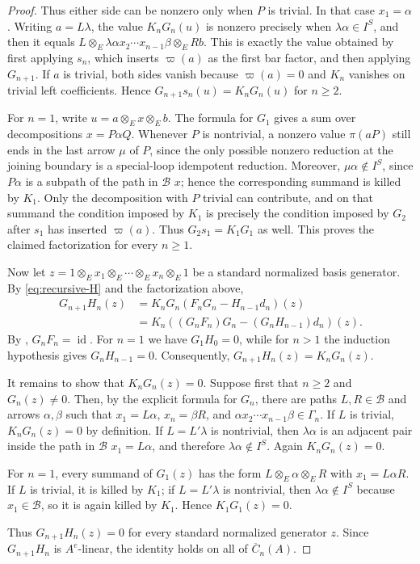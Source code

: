 \documentclass[11pt,a4paper,reqno]{amsart}
\newcommand{\mB}{\mathcal B}
\newcommand{\id}{\operatorname{id}}
\theoremstyle{plain}
\theoremstyle{definition}
\numberwithin{equation}{section}
\begin{document}
\begin{proof}
		Thus either side can be nonzero only when $P$ is trivial.  In that
		case $x_1=\alpha$.  Writing $a=L\lambda$, the value $K_nG_n(u)$ is
		nonzero precisely when $\lambda\alpha\in I^S$, and then it equals
		$L\otimes_E\lambda\alpha x_2\cdots x_{n-1}\beta\otimes_E Rb$.
		This is exactly the value obtained by first applying $s_n$, which
		inserts $\varpi(a)$ as the first bar factor, and then applying
		$G_{n+1}$.  If $a$ is trivial, both sides vanish because $\varpi(a)=0$
		and $K_n$ vanishes on trivial left coefficients.  Hence
		$G_{n+1}s_n(u)=K_nG_n(u)$ for $n\geq2$.
		
		For $n=1$, write $u=a\otimes_E x\otimes_E b$. The formula for $G_1$
		gives a sum over decompositions $x=P\alpha Q$. Whenever $P$ is
		nontrivial, a nonzero value $\pi(aP)$ still ends
		in the last arrow $\mu$ of $P$, since the only possible nonzero reduction
		at the joining boundary is a special-loop idempotent reduction. Moreover,
		$\mu\alpha\notin I^S$, since $P\alpha$ is a subpath of the path in $\mB$
		$x$; hence the corresponding summand is killed by $K_1$.  Only the
		decomposition with $P$ trivial can contribute, and on that summand
		the condition imposed by $K_1$ is precisely the condition imposed by
		$G_2$ after $s_1$ has inserted $\varpi(a)$.  Thus
		$G_2s_1=K_1G_1$ as well.  This proves the claimed factorization for
		every $n\geq1$.
		
		Now let
		$z=1\otimes_E x_1\otimes_E\cdots\otimes_E x_n\otimes_E1$
		be a standard normalized basis generator.  By
		\eqref{eq:recursive-H} and the factorization above,
		\[
		\begin{aligned}
			G_{n+1}H_n(z)
			&=
			K_nG_n(F_nG_n-H_{n-1}d_n)(z)\\
			&=
			K_n((G_nF_n)G_n-(G_nH_{n-1})d_n)(z).
		\end{aligned}
		\]
		By , $G_nF_n=\id$.  For $n=1$ we have
		$G_1H_0=0$, while for $n>1$ the induction hypothesis gives
		$G_nH_{n-1}=0$.  Consequently,
		$G_{n+1}H_n(z)=K_nG_n(z)$.
		
		It remains to show that $K_nG_n(z)=0$.  Suppose first that $n\geq2$
		and $G_n(z)\neq0$.  Then, by the explicit formula for $G_n$, there
		are paths $L,R\in\mB$ and arrows $\alpha,\beta$ such that
		$x_1=L\alpha$, $x_n=\beta R$, and
		$\alpha x_2\cdots x_{n-1}\beta\in\Gamma_n$.  If $L$ is trivial,
		$K_nG_n(z)=0$ by definition.  If $L=L'\lambda$ is nontrivial, then
		$\lambda\alpha$ is an adjacent pair inside the path in $\mB$
		$x_1=L\alpha$, and therefore $\lambda\alpha\notin I^S$.  Again
		$K_nG_n(z)=0$.
		
		For $n=1$, every summand of $G_1(z)$ has the form
		$L\otimes_E\alpha\otimes_E R$ with $x_1=L\alpha R$.  If $L$ is
		trivial, it is killed by $K_1$; if $L=L'\lambda$ is nontrivial,
		then $\lambda\alpha\notin I^S$ because $x_1\in\mB$, so it is
		again killed by $K_1$.  Hence $K_1G_1(z)=0$.
		
		Thus $G_{n+1}H_n(z)=0$ for every standard normalized generator $z$.
		Since $G_{n+1}H_n$ is $A^e$-linear, the identity holds on all of
		$\overline C_n(A)$.
	\end{proof}
	
\end{document}
